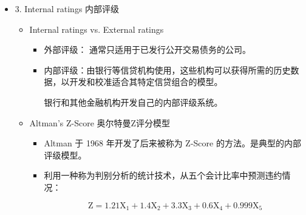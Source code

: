 \begin{itemize}
\begin{itemize}
\begin{itemize}
        \item  Promoting Debt Explosion 促进债务增长：
        
        信用评分和评级提高了金融和信贷机构的风险估计能力， 从而使银行和其他信贷机构能够降低其风险溢价和债务融资成本。

        \item Poor Predictive Ability 预测能力不足：
        
        2007-2008 年全球信贷危机爆发， 评级机构未能预测到一些企业破产(如雷曼兄弟、安然等)引发了对评级机构评级预测能力的质疑。另外几项实证研究发现， 与金融机构内部开发的违约预测模型相比，评级机构的评级预测企业违约的能力较弱。

        \item Pro-cyclicality 顺周期性：
        
        在经济增长期间，评级过于乐观，在衰退时期过于悲观，因此显示出顺周期性的行为。 
\end{itemize}
\end{itemize}


\item 3. Internal ratings 内部评级
    \begin{itemize}
    \item Internal ratings vs. External ratings
        \begin{itemize}

        \item 外部评级： 通常只适用于已发行公开交易债务的公司。
        

        \item 内部评级：由银行等信贷机构使用，这些机构可以获得所需的历史数据，以开发和校准适合其特定信贷组合的模型。
        
        银行和其他金融机构开发自己的内部评级系统。
        \end{itemize}

    \item Altman's Z-Score 奥尔特曼Z评分模型
        \begin{itemize}

        \item  Altman 于 1968 年开发了后来被称为 Z-Score 的方法。是典型的内部评级模型。
        
        \item 利用一种称为判别分析的统计技术，从五个会计比率中预测违约情况：
        
        \[
        \mathrm{Z} = {1.21}{\mathrm{X}}_{1} + {1.4}{\mathrm{X}}_{2} + {3.3}{\mathrm{X}}_{3} + {0.6}{\mathrm{X}}_{4} + {0.999}{\mathrm{X}}_{5}
        \]
        

\end{itemize}
\end{itemize}
\end{itemize}

